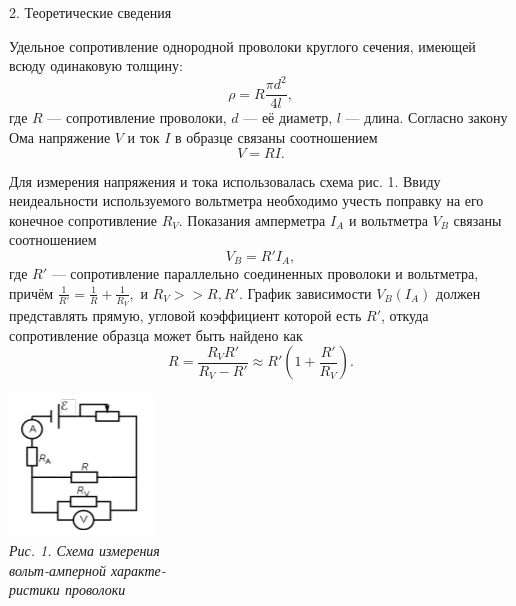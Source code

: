 \documentclass[12pt, a4paper]{article}
\begin{document}
        {\large 2. Теоретические сведения \\}

        Удельное сопротивление однородной проволоки круглого сечения, имеющей всюду одинаковую толщину: \\
        \begin{equation}
            \rho = R \frac{\pi d^2}{4l},
        \end{equation}
где $𝑅$ — сопротивление проволоки, $d$ — её диаметр, $𝑙$ — длина.
    Согласно закону Ома напряжение $𝑉$ и ток $𝐼$ в образце связаны соотношением
\begin{equation}
    V = RI.
\end{equation}

\noindent\begin{minipage}[c]{0.67\textwidth}
    \hspace{1cm}Для измерения напряжения и тока использовалась схема рис. 1.
    Ввиду неидеальности используемого вольтметра необходимо
учесть поправку на его конечное сопротивление $𝑅_𝑉$. Показания амперметра $I_A$ и вольтметра $V_B$ связаны соотношением
\begin{equation}
    V_B = R'I_A,
\end{equation}
где $𝑅′$ — сопротивление параллельно соединенных проволоки и
вольтметра, причём $\frac{1}{R'} = \frac{1}{R} + \frac{1}{R_V},$ и $R_V >> R, R'$. График зависимости
$𝑉_B (𝐼_A)$ должен представлять прямую, угловой коэффициент которой есть $𝑅′$, откуда сопротивление образца может быть найдено как
\begin{displaymath}
    R =\frac{R_V R'}{R_V - R'} \approx R'(1 + \frac{R'}{R_V}).
\end{displaymath}
\end{minipage}
\begin{minipage}[c]{0.32\textwidth}
    \begin{center}
        \includegraphics[scale=1]{Pics/scheme1.jpg} \\
        \textit{\textcolor[HTML]{000000}{Рис. 1. Схема измерения \\ вольт-амперной характе- \\ ристики проволоки}}
    \end{center}
\end{minipage}
\end{document}
